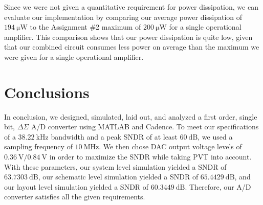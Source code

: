 \documentclass[journal,hidelinks]{IEEEtran}
\begin{document}
Since we were not given a quantitative requirement for power dissipation, we can evaluate our implementation by comparing our average power dissipation of $\SI{194}{\micro\watt}$ to the Assignment \#2 maximum of $\SI{200}{\micro\watt}$ for a single operational amplifier. This comparison shows that our power dissipation is quite low, given that our combined circuit consumes less power on average than the maximum we were given for a single operational amplifier.

\section{Conclusions}

In conclusion, we designed, simulated, laid out, and analyzed a first order, single bit, $\Delta \Sigma$ A/D converter using MATLAB and Cadence. To meet our specifications of a $\SI{38.22}{\kilo\hertz}$ bandwidth and a peak SNDR of at least $\SI{60}{\deci\bel}$, we used a sampling frequency of $\SI{10}{\mega\hertz}$. We then chose DAC output voltage levels of $\SI{0.36}{\volt}/\SI{0.84}{\volt}$ in order to maximize the SNDR while taking PVT into account. With these parameters, our system level simulation yielded a SNDR of $\SI{63.7303}{\deci\bel}$, our schematic level simulation yielded a SNDR of $\SI{65.4429}{\deci\bel}$, and our layout level simulation yielded a SNDR of $\SI{60.3449}{\deci\bel}$. Therefore, our A/D converter satisfies all the given requirements.



\end{document}
